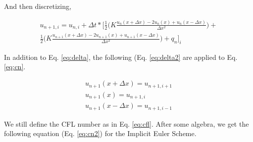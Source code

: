\documentclass[10pt, letter, showtrims]{extarticle}
\begin{document}
		\noindent
		And then discretizing,
		
		\begin{equation}
		\label{eq:cn}
			\begin{split}
			u_{n+1,i} = u_{n,i} + \Delta t * \Big[ \frac{1}{2} \big( K \frac{u_{n}(x + \Delta x) - 2 u_{n}(x) + u_{n}(x - \Delta x)}{\Delta x^{2}} \big) + \\
			 \frac{1}{2} \big( K \frac{u_{n+1}(x + \Delta x) - 2 u_{n+1}(x) + u_{n+1}(x - \Delta x)}{\Delta x^{2}} \big) + q_{n} \Big]_{i}
			\end{split}
		\end{equation}
		
%		
		
		\noindent
		In addition to Eq. \ref{eq:delta}, the following (Eq. \ref{eq:delta2} are applied to Eq. \ref{eq:cn}.
		
		\begin{equation}
		\label{eq:delta2}
			\begin{split}
				u_{n+1}(x + \Delta x) = u_{n+1,i+1} \\
				u_{n+1}(x)            = u_{n+1,i} \\
				u_{n+1}(x - \Delta x) = u_{n+1,i-1}
			\end{split}
		\end{equation}
		
		\noindent
		We still define the CFL number as in Eq. \ref{eq:cfl}. After some algebra, we get the following equation (Eq. \ref{eq:cn2}) for the Implicit Euler Scheme.
		
%		
%		
		
\end{document}
